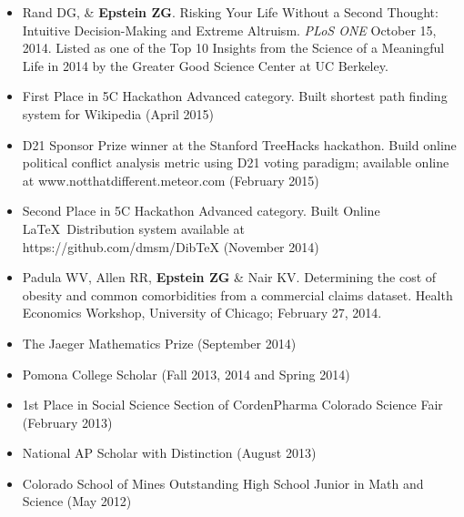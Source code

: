 \documentclass{res}
\begin{document}
\begin{resume}
  
\hspace{1.62in}{\bf PRESENTATATIONS, AWARDS AND PUBLICATIONS}
 \vspace{0.1in}	
\begin{itemize}
	 \setlength\itemsep{.1em}
 \item Rand DG, \& {\bf Epstein ZG}. Risking Your Life Without a Second Thought: Intuitive Decision-Making and Extreme Altruism. \textit{PLoS ONE} October 15, 2014. Listed as one of the Top 10 Insights from the Science of a Meaningful Life in 2014 by the Greater Good Science Center at UC Berkeley.
\item First Place in 5C Hackathon Advanced category. Built shortest path finding system for Wikipedia (April 2015)
\item D21 Sponsor Prize winner at the Stanford TreeHacks hackathon. Build online political conflict analysis metric using D21 voting paradigm; available online at www.notthatdifferent.meteor.com (February 2015)
\item Second Place in 5C Hackathon Advanced category. Built Online \LaTeX  \ Distribution system available at \\https://github.com/dmsm/DibTeX (November 2014)
\item Padula WV, Allen RR, {\bf Epstein ZG} \& Nair KV. Determining the cost of obesity and common comorbidities from a commercial claims dataset. Health Economics Workshop, University of Chicago; February 27, 2014.
\item The Jaeger Mathematics Prize (September 2014) 
\item Pomona College Scholar (Fall 2013, 2014 and Spring 2014)
\item 1st Place in Social Science Section of CordenPharma Colorado Science Fair (February 2013)
\item National AP Scholar with Distinction (August 2013)
\item Colorado School of Mines Outstanding High School Junior in Math and Science (May 2012)	
\end{itemize} 
 
\end{resume}
\end{document}
